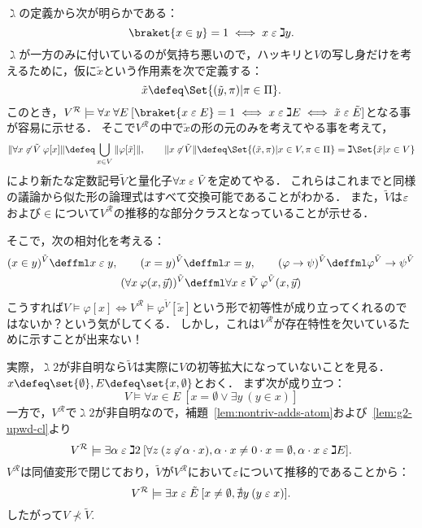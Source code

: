 \documentclass[realisability.tex]{subfiles}
\begin{document}
\begin{remark}
 $\gimel$の定義から次が明らかである：
 \[
  \braket{x \in y} = 1 \iff x \strin \gimel y.
 \]
 $\gimel$が一方のみに付いているのが気持ち悪いので，ハッキリと$V$の写し身だけを考えるために，仮に$\tilde{x}$という作用素を次で定義する：
 \[
  \tilde{x} \defeq \Set{ (\tilde{y}, \pi) | \pi \in \Pi }.
 \]
 このとき，$V^{\mathcal{R}} \models \forall x \: \forall E \: [\braket{x \strin E} = 1 \iff x \strin \gimel E \iff \tilde{x} \strin \tilde{E}]$となる事が容易に示せる．
 そこで$V^{\mathcal{R}}$の中で$\tilde{x}$の形の元のみを考えてやる事を考えて，
 \[
  \|\forall x \strnin \tilde{V} \: \varphi[x]\| \defeq
  \bigcup_{x \in V} \|\varphi[\tilde{x}]\|, \qquad
  \| x \strnin \tilde{V}\| \defeq \Set{ (\tilde{x}, \pi) | x \in V, \pi \in \Pi}
  = \gimel\Set{\tilde{x} | x \in V}
 \]
 により新たな定数記号$\tilde{V}$と量化子$\forall x \mathrel{\varepsilon} \tilde{V}$を定めてやる．
 これらはこれまでと同様の議論から似た形の論理式はすべて交換可能であることがわかる．
 また，$\tilde{V}$は$\mathrel{\varepsilon}$および$\in$について$V^{\mathcal{R}}$の推移的な部分クラスとなっていることが示せる．

 そこで，次の相対化を考える：
 \begin{gather*}
  (x \in y)^{\tilde{V}} \deffml x \strin y, \qquad
  (x = y)^{\tilde{V}} \deffml x = y, \qquad
  (\varphi \to \psi)^{\tilde{V}} \deffml \varphi^{\tilde{V}} \to \psi^{\tilde{V}} \\
  (\forall x \: \varphi(x, \vec{y}))^{\tilde{V}} \deffml
  \forall x \strin \tilde{V} \: \varphi^{\tilde{V}}(x, \vec{y})
 \end{gather*} 
 こうすれば$V \models \varphi[x] \iff V^{\mathcal{R}} \models \varphi^{\tilde{V}}[\tilde{x}]$という形で初等性が成り立ってくれるのではないか？という気がしてくる．
 しかし，これは$V^{\mathcal{R}}$が存在特性を欠いているために示すことが出来ない！

 実際，$\gimel 2$が非自明なら$\tilde{V}$は実際に$V$の初等拡大になっていないことを見る．
 $x \defeq \set{\emptyset}, E \defeq \set{ x, \emptyset }$とおく．
 まず次が成り立つ：
 \[
  V \models \forall x \in E \: [x = \emptyset \lor \exists y \: (y \in x)]
 \]
 一方で，$V^{\mathcal{R}}$で$\gimel 2$が非自明なので，補題~\ref{lem:nontriv-adds-atom}および~\ref{lem:g2-upwd-cl}より
 \[
  V^{\mathcal{R}} \models \exists \alpha \mathrel{\varepsilon} \gimel 2 \: [\forall z\:(z \not\mathrel{\varepsilon} \alpha \cdot x), \alpha \cdot x \neq 0 \cdot x = \emptyset, \alpha \cdot x \mathrel{\varepsilon} \gimel E].
 \]
 $V^{\mathcal{R}}$は同値変形で閉じており，$\tilde{V}$が$V^{\mathcal{R}}$において$\mathrel{\varepsilon}$について推移的であることから：
 \[
  V^{\mathcal{R}} \models \exists x \mathrel{\varepsilon} \tilde{E}\:[x \neq \emptyset, \nexists y \:(y \mathrel{\varepsilon} x)].
 \]
 したがって$V \not\prec \tilde{V}$.
\end{remark}
\end{document}
